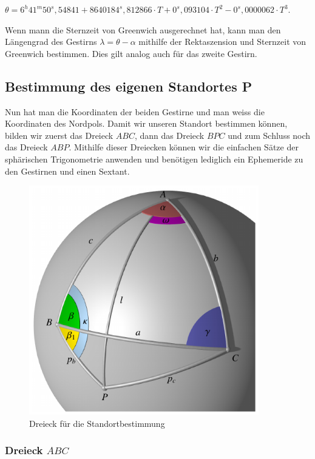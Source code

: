 $\theta = 6^h 41^m 50^s,54841 + 8640184^s,812866 \cdot T + 0^s,093104 \cdot T^2 - 0^s,0000062 \cdot T^3$.

Wenn mann die Sternzeit von Greenwich ausgerechnet hat, kann man den Längengrad des Gestirns $\lambda = \theta - \alpha$ mithilfe der Rektaszension und Sternzeit von Greenwich bestimmen. 
Dies gilt analog auch für das zweite Gestirn.

\subsection{Bestimmung des eigenen Standortes P}
Nun hat man die Koordinaten der beiden Gestirne und man weiss die Koordinaten des Nordpols.
Damit wir unseren Standort bestimmen können, bilden wir zuerst das Dreieck $ABC$, dann das Dreieck $BPC$ und zum Schluss noch das Dreieck $ABP$.
Mithilfe dieser Dreiecken können wir die einfachen Sätze der sphärischen Trigonometrie anwenden und benötigen lediglich ein Ephemeride zu den Gestirnen und einen Sextant.

\begin{figure}
	\begin{center}
		\includegraphics[width=10cm]{papers/nav/bilder/dreieck.pdf}
		\caption[Dreieck für die Standortbestimmung]{Dreieck für die Standortbestimmung}
	\end{center}
\end{figure}


\subsubsection{Dreieck $ABC$}

